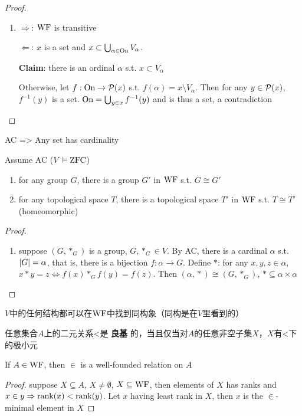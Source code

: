 \documentclass[11pt]{article}
\begin{document}
\begin{proof}
\begin{enumerate}
\item \(\Rightarrow\): \(\operatorname{WF}\) is transitive

\(\Leftarrow\): \(x\) is a set and \(x\subset\bigcup_{\alpha\in\operatorname{On}}V_\alpha\).

\textbf{Claim}: there is an ordinal \(\alpha\) s.t. \(x\subset V_\alpha\)

Otherwise, let \(f:\operatorname{On}\to\mathcal{P}(x)\) s.t. \(f(\alpha)=x\setminus V_\alpha\). Then for any \(y\in\mathcal{P}(x)\), \(f^{-1}(y)\) is
a set. \(\operatorname{On}=\bigcup_{y\in x}f^{-1}(y)\) and is thus a set, a contradiction
\end{enumerate}
\end{proof}

AC => Any set has cardinality
\begin{lemma}[]
Assume AC (\(V\vDash\operatorname{ZFC}\))
\begin{enumerate}
\item for any group \(G\), there is a group \(G'\) in \(\operatorname{WF}\) s.t. \(G\cong G'\)
\item for any topological space \(T\), there is a topological space \(T'\) in \(\operatorname{WF}\)
s.t. \(T\cong T'\) (homeomorphic)
\end{enumerate}
\end{lemma}

\begin{proof}
\begin{enumerate}
\item suppose \((G,*_G)\) is a group, \(G,*_G\in V\). By AC, there is a cardinal \(\alpha\)
s.t. \(\abs{G}=\alpha\), that is, there is a bijection \(f:\alpha\to G\). Define \(*\): for
any \(x,y,z\in\alpha\), \(x*y=z\Leftrightarrow f(x)*_Gf(y)=f(z)\). Then \((\alpha,​*)\cong(G,​*_G)\), \(​*\subseteq\alpha\times\alpha\)
\end{enumerate}
\end{proof}

\(V\)中的任何结构都可以在\(\operatorname{WF}\)中找到同构象（同构是在\(V\)里看到的）

\begin{definition}[]
任意集合\(A\)上的二元关系<是 \textbf{良基} 的，当且仅当对\(A\)的任意非空子集\(X\)，\(X\)有<下的极小元
\end{definition}

\begin{theorem}[]
If \(A\in\operatorname{WF}\), then \(\in\) is a well-founded relation on \(A\)
\end{theorem}

\begin{proof}
suppose \(X\subseteq A\), \(X\neq\emptyset\), \(X\subseteq\operatorname{WF}\), then elements of \(X\) has ranks
and \(x\in y\Rightarrow\text{rank}(x)<\text{rank}(y)\). Let \(x\) having least rank in \(X\), then \(x\) is
the \(\in\)-minimal element in \(X\)
\end{proof}
\end{document}
